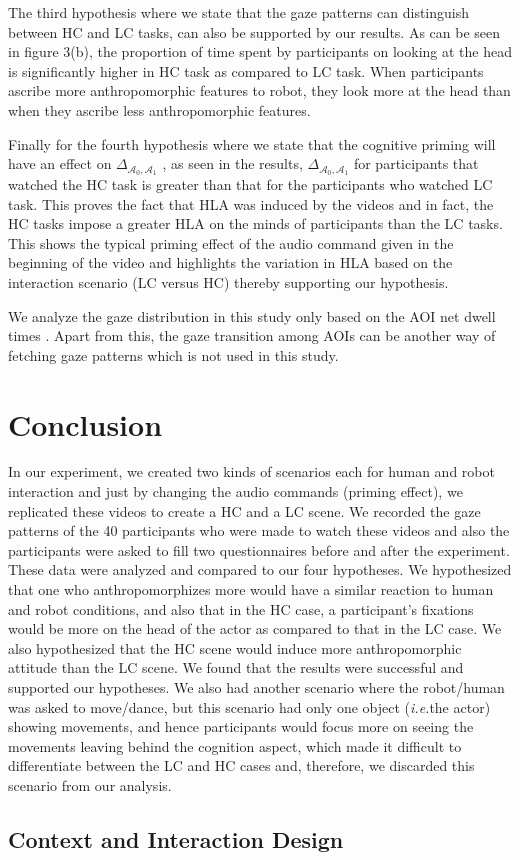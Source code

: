 \documentclass[a4,twocolumn,10pt]{article}
\newcommand{\ie}{{\textit{i.e.\xspace}}}
\newcommand{\deltaant}{{ $\Delta_{\mathcal{A}_0,\mathcal{A}_1}$ }}
\begin{document}
The third hypothesis where we state that the gaze patterns can distinguish
between HC and LC tasks, can also be supported by our results. As can be seen in
figure 3(b), the proportion of time spent by participants on looking at the head
is significantly higher in HC task as compared to LC task. When participants
ascribe more anthropomorphic features to robot, they look more at the head than
when they ascribe less anthropomorphic features.

Finally for the fourth hypothesis where we state that the cognitive priming will
have an effect on \deltaant, as seen in the results, \deltaant
for participants that watched the HC task is greater than that for the
participants who watched LC task. This proves the fact that HLA was induced by
the videos and in fact, the HC tasks impose a greater HLA on the minds of
participants than the LC tasks. This shows the typical priming effect of the
audio command given in the beginning of the video and highlights the variation
in HLA based on the interaction scenario (LC versus HC) thereby supporting our
hypothesis. 

We analyze the gaze distribution in this study only based on the AOI net dwell
times . Apart from this, the gaze transition among AOIs can be another way of
fetching gaze patterns which is not used in this study.

\section{Conclusion}

In our experiment, we created two kinds of scenarios each for human and
robot interaction and just by changing the audio commands (priming
effect), we replicated these videos to create a HC and a LC scene. We recorded
the gaze patterns of the 40 participants who were made to watch these videos and
also the participants were asked to fill two questionnaires before and after the
experiment. These data were analyzed and compared to our four hypotheses. We
hypothesized that one who anthropomorphizes more would have a similar reaction
to human and robot conditions, and also that in the HC case, a
participant's fixations would be more on the head of the actor as compared to
that in the LC case. We also hypothesized that the HC scene would induce more
anthropomorphic attitude than the LC scene. We found that the results were
successful and supported our hypotheses. We also had another scenario where the
robot/human was asked to move/dance, but this scenario had only one object
(\ie the actor) showing movements, and hence participants would focus
more on seeing the movements leaving behind the cognition aspect, which made it
difficult to differentiate between the LC and HC cases and, therefore, we
discarded this scenario from our analysis.

\subsection{Context and Interaction Design}





%
%
\end{document}
